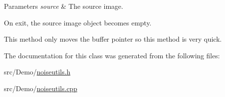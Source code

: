 \begin{DoxyParams}{Parameters}
{\em source} & The source image.\\
\hline
\end{DoxyParams}
On exit, the source image object becomes empty.

This method only moves the buffer pointer so this method is very quick. 

The documentation for this class was generated from the following files\+:\begin{DoxyCompactItemize}
\item 
src/\+Demo/\hyperlink{_demo_2noiseutils_8h}{noiseutils.\+h}\item 
src/\+Demo/\hyperlink{_demo_2noiseutils_8cpp}{noiseutils.\+cpp}\end{DoxyCompactItemize}
